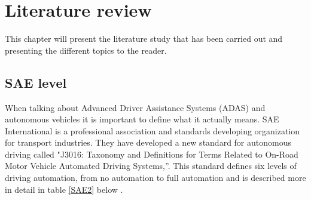 \chapter{Literature review}
This chapter will present the literature study that has been carried out and presenting the different topics to the reader.



\section{SAE level}
When talking about Advanced Driver Assistance Systems (ADAS) and autonomous vehicles it is important to define what it actually means. SAE International is a professional association and standards developing organization for transport industries. They have developed a new standard for autonomous driving called  "J3016: Taxonomy and Definitions for Terms Related to On-Road Motor Vehicle Automated Driving Systems,”. This standard defines six levels of driving automation, from no automation to full automation and is described more in detail in table \ref{SAE2} below \cite{SAE} \cite{SAEweb}. 


